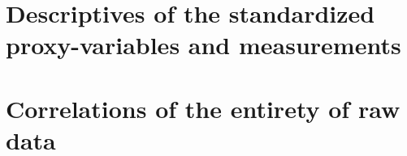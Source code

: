 \newpage%
\section{Descriptives of the standardized proxy-variables and measurements}\label{sec:descr-stand-proxy}
\addtolength{\tabcolsep}{-2pt}  
\renewcommand{\captionGlo} {Basic descriptive statistics based on standardized velocity measurement and approximation data from 01.06.2013 to 01.06.2019 with $\perd = \wndwLength = 1 \ttext{ day} $.}%
\renewcommand{\labelGlo}   {\label{tbl:appendix_desc_other_stand}}%
\addtolength{\tabcolsep}{+2pt}

\section{Correlations of the entirety of raw data}\label{sec:corr-entir-raw}
\addtolength{\tabcolsep}{-5pt}  
\renewcommand{\captionGlo} {Correlations based on Bitcoin data from 01.06.2013 to 01.06.2019 with $\perd = \wndwLength = 1 \ttext{ day} $.}%
\renewcommand{\labelGlo}   {\label{tbl:corrtable_all}}%
\addtolength{\tabcolsep}{+5pt}



%
